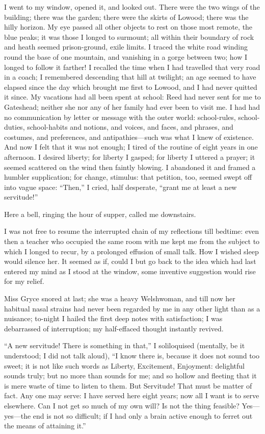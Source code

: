 I went to my window, opened it, and looked out. There were the two
wings of the building; there was the garden; there were the skirts of
Lowood; there was the hilly horizon. My eye passed all other objects to
rest on those most remote, the blue peaks; it was those I longed to
surmount; all within their boundary of rock and heath seemed
prison-ground, exile limits. I traced the white road winding round the
base of one mountain, and vanishing in a gorge between two; how I longed
to follow it farther! I recalled the time when I had travelled that
very road in a coach; I remembered descending that hill at twilight; an
age seemed to have elapsed since the day which brought me first to
Lowood, and I had never quitted it since. My vacations had all been
spent at school: \Mrs{} Reed had never sent for me to Gateshead; neither
she nor any of her family had ever been to visit me. I had had no
communication by letter or message with the outer world: school-rules,
school-duties, school-habits and notions, and voices, and faces, and
phrases, and costumes, and preferences, and antipathies---such was what
I knew of existence. And now I felt that it was not enough; I tired of
the routine of eight years in one afternoon. I desired liberty; for
liberty I gasped; for liberty I uttered a prayer; it seemed scattered on
the wind then faintly blowing. I abandoned it and framed a humbler
supplication; for change, stimulus: that petition, too, seemed swept off
into vague space: \enquote{Then,} I cried, half desperate,
\enquote{grant me at least a new servitude!}

Here a bell, ringing the hour of supper, called me downstairs.

I was not free to resume the interrupted chain of my reflections till
bedtime: even then a teacher who occupied the same room with me kept me
from the subject to which I longed to recur, by a prolonged effusion of
small talk. How I wished sleep would silence her. It seemed as if,
could I but go back to the idea which had last entered my mind as I
stood at the window, some inventive suggestion would rise for my relief.

Miss Gryce snored at last; she was a heavy Welshwoman, and till now her
habitual nasal strains had never been regarded by me in any other light
than as a nuisance; to-night I hailed the first deep notes with
satisfaction; I was debarrassed of interruption; my half-effaced thought
instantly revived.

\enquote{A new servitude! There is something in that,} I soliloquised
(mentally, be it understood; I did not talk aloud), \enquote{I know
there is, because it does not sound too sweet; it is not like such words
as Liberty, Excitement, Enjoyment: delightful sounds truly; but no more
than sounds for me; and so hollow and fleeting that it is mere waste of
time to listen to them. But Servitude! That must be matter of fact. 
Any one may serve: I have served here eight years; now all I want is to
serve elsewhere. Can I not get so much of my own will? Is not the
thing feasible? Yes---yes---the end is not so difficult; if I had only
a brain active enough to ferret out the means of attaining it.}


